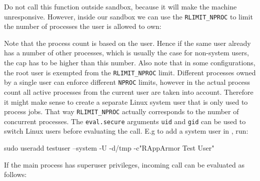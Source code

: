 Do not call this function outside sandbox, because it will make the machine
unresponsive. However, inside our sandbox we can use the \texttt{RLIMIT\_NPROC}
to limit the number of processes the user is allowed to own:

\begin{knitrout}\mycodesize
{}\color{fgcolor}\begin{kframe}
\begin{alltt}
\hlstd{(}\hlstd{(),}  \hlstd{=} \hlstd{)}
\end{alltt}


{\ttfamily\noindent\bfseries\color{errorcolor}{\#\# Error: unable to fork, possible reason: Resource temporarily unavailable}}\end{kframe}
\end{knitrout}


Note that the process count is based on the \Linux user. Hence if the same
\Linux user already has a number of other processes, which is usually the case
for non-system users, the cap has to be higher than this number. Also note that
in some \Linux configurations, the root user is exempted from the
\texttt{RLIMIT\_NPROC} limit. 
Different processes owned by a single user can enforce different \texttt{NPROC}
limits, however in the actual process count all active processes from the
current user are taken into account. Therefore it might make sense to create a
separate Linux system user that is only used to process \R jobs. That way
\texttt{RLIMIT\_NPROC} actually corresponds to the number of concurrent \R
processes. The \texttt{eval.secure} arguments \texttt{uid} and \texttt{gid}
can be used to switch Linux users before evaluating the call. E.g to add a
system user in \Linux, run:

\begin{codeblock}
sudo useradd testuser --system -U -d/tmp -c"RAppArmor Test User"
\end{codeblock}
If the main \R process has superuser privileges, incoming call can be
evaluated as follows:

\begin{knitrout}\mycodesize
{}\color{fgcolor}\begin{kframe}
\begin{alltt}
\hlstd{(}\hlstd{(),}  \hlstd{=} \hlstd{,}  \hlstd{=} \hlstd{,}  \hlstd{=} \hlstd{)}
\end{alltt}
\end{kframe}
\end{knitrout}



